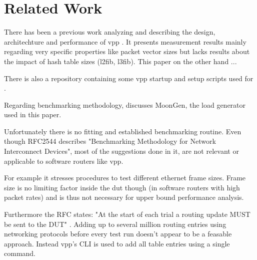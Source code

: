 \section{Related Work}

There has been a previous work analyzing and describing the design,
architechture and performance of \Ac{vpp} \cite{linguaglossa2017high}.
It presents measurement results mainly regarding very specific
properties like packet vector sizes but lacks results about the impact
of hash table sizes (l2fib, l3fib). This paper on the other hand ...


There is also a repository \cite{github:vpp-bench} containing some
\Ac{vpp} startup and setup scripts used for
\cite{linguaglossa2017high}.


Regarding benchmarking methodology, \cite{emmerich2015moongen}
discusses MoonGen, the load generator used in this paper.


Unfortunately there is no fitting and established benchmarking
routine. Even though RFC2544 \cite{rfc2544} describes "Benchmarking
Methodology for Network Interconnect Devices", most of the suggestions
done in it, are not relevant or applicable to software routers like
\Ac{vpp}.


For example it stresses procedures to test different ethernet frame
sizes. Frame size is no limiting factor inside the \Ac{dut} though (in
software routers with high packet rates) and is thus not necessary for
upper bound performance analysis. \cite{emmerich2015assessing}


Furthermore the RFC states: "At the start of each trial a routing
update MUST be sent to the DUT" \cite{rfc2544}. Adding up to several
million routing entries using networking protocols before every test
run doesn't appear to be a feasable approach. Instead \Ac{vpp}'s CLI
is used to add all table entries using a single command.


